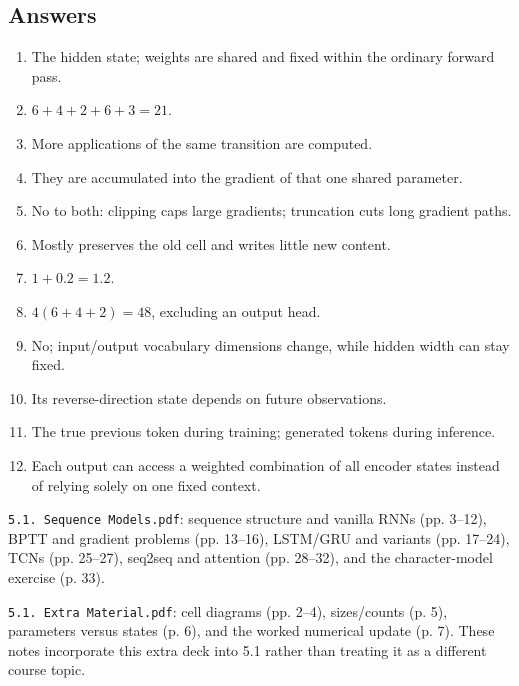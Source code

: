 \documentclass[11pt]{article}
\begin{document}
\subsection{Answers}
\begin{enumerate}
\item The hidden state; weights are shared and fixed within the ordinary forward pass.
\item $6+4+2+6+3=21$.
\item More applications of the same transition are computed.
\item They are accumulated into the gradient of that one shared parameter.
\item No to both: clipping caps large gradients; truncation cuts long gradient paths.
\item Mostly preserves the old cell and writes little new content.
\item $1+0.2=1.2$.
\item $4(6+4+2)=48$, excluding an output head.
\item No; input/output vocabulary dimensions change, while hidden width can stay fixed.
\item Its reverse-direction state depends on future observations.
\item The true previous token during training; generated tokens during inference.
\item Each output can access a weighted combination of all encoder states instead of relying solely on one fixed context.
\end{enumerate}

\texttt{5.1. Sequence Models.pdf}: sequence structure and vanilla RNNs (pp. 3--12), BPTT and gradient problems (pp. 13--16), LSTM/GRU and variants (pp. 17--24), TCNs (pp. 25--27), seq2seq and attention (pp. 28--32), and the character-model exercise (p. 33).

\texttt{5.1. Extra Material.pdf}: cell diagrams (pp. 2--4), sizes/counts (p. 5), parameters versus states (p. 6), and the worked numerical update (p. 7). These notes incorporate this extra deck into 5.1 rather than treating it as a different course topic.
\end{document}
